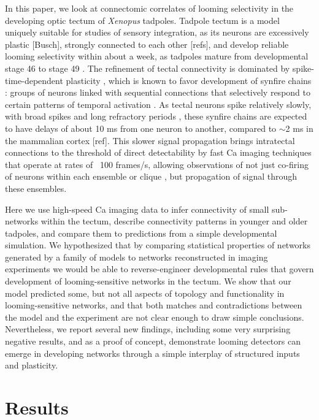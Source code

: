 \documentclass{article}
\begin{document}
In this paper, we look at connectomic correlates of looming selectivity in the developing optic tectum of \textit{Xenopus} tadpoles. Tadpole tectum is a model uniquely suitable for studies of sensory integration, as its neurons are excessively plastic \citep{pratt2007intrinsic}[Busch], strongly connected to each other \citep{james2015}[refs], and develop reliable looming selectivity within about a week, as tadpoles mature from developmental stage 46 to stage 49 \citep{dong2009,khakhalin2014}. The refinement of tectal connectivity is dominated by spike-time-dependent plasticity \citep{zhang1998stdp,mu2006stdp}, which is known to favor development of synfire chains \citep{fiete2010chains,zheng2014synfire}: groups of neurons linked with sequential connections that selectively respond to certain patterns of temporal activation \citep{clopath2010stdpcoding}. As  tectal neurons spike relatively slowly, with broad spikes and long refractory periods \citep{ciarleglio2015,jang2016}, these synfire chains are expected to have delays of about 10 ms from one neuron to another, compared to $\sim$2 ms in the mammalian cortex [ref]. This slower signal propagation brings intratectal connections to the threshold of direct detectability by fast Ca imaging techniques that operate at rates of ~100 frames/s, allowing observations of not just co-firing of neurons within each ensemble or clique \citep{reimann2017,avitan2017spontaneous}, but propagation of signal through these ensembles.

Here we use high-speed Ca imaging data to infer connectivity of small sub-networks within the tectum, describe connectivity patterns in younger and older tadpoles, and compare them to predictions from a simple developmental simulation. We hypothesized that by comparing statistical properties of networks generated by a family of models to networks reconstructed in imaging experiments we would be able to reverse-engineer developmental rules that govern development of looming-sensitive networks in the tectum. We show that our model predicted some, but not all aspects of topology and functionality in looming-sensitive networks, and that both matches and contradictions between the model and the experiment are not clear enough to draw simple conclusions. Nevertheless, we report several new findings, including some very surprising negative results, and as a proof of concept, demonstrate looming detectors can emerge in developing networks through a simple interplay of structured inputs and plasticity.

\section*{Results}
\end{document}
